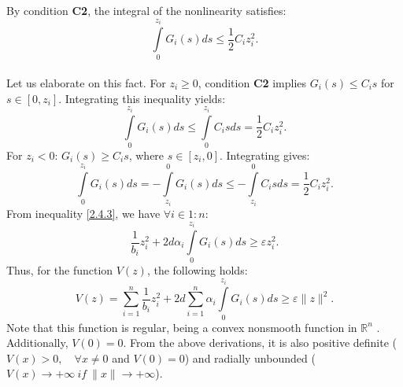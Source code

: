 \documentclass[journal]{IEEEtran}
\begin{document}
\begin{IEEEproof}
By condition \textbf{C2}, the integral of the nonlinearity satisfies:
\[
\int\limits_0^{z_i}G_i(s)ds \leqslant\frac {1}{2} C_iz_i^2.
\]\\
Let us elaborate on this fact. For $z_i \geqslant 0 $, condition \textbf{C2} implies $G_i(s) \leqslant C_i s$ for $s\in [0,z_i]$. Integrating this inequality yields:
\[
\int\limits_0^{z_i} G_i (s) ds \leqslant\int\limits_0^{z_i}C_i sds = \frac{1}{2}C_iz_i^2.
\]
For $z_i < 0$: $G_i(s) \geqslant C_i s$, where $s\in [z_i,0]$. Integrating gives:
\[
\int\limits_0^{z_i}G_i(s)ds = - \int\limits_{z_i}^0G_i(s)ds \leqslant - \int\limits_{z_i}^0C_isds= \frac{1}{2}C_iz_i^2.
\]
From inequality \eqref{2.4.3}, we have $\forall i \in 1 : n$:
\[
\frac{1}{b_i}z_i^2+ 2 d \alpha_i \int\limits_0^{z_i} G_i(s)ds \geqslant \varepsilon z_i^2.
\]
Thus, for the function $V(z)$, the following holds:
\[
V(z) = \sum_{i=1}^n\frac{1}{b_i}z_i^2 + 2 d \sum_{i=1}^n\alpha_i \int\limits_0^{z_i}G_i(s)ds \geqslant \varepsilon \|z\|^2.
\]
Note that this function is regular, being a convex nonsmooth function in $\mathbb{R}^n$ \cite{516}. Additionally, $V(0)=0$. From the above derivations, it is also positive definite ($V(x)>0, \quad \forall x\ne 0$ and $V(0)=0$) and radially unbounded ($V(x)\to +\infty ~if ~\|x\| \to +\infty$).


\end{IEEEproof}
\end{document}
